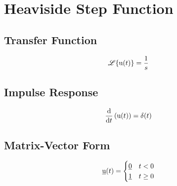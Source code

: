 \section*{Heaviside Step Function}
\subsection*{Transfer Function}
\[
    \laplace{\func{u}[t]} = \frac{1}{s}
\]

\subsection*{Impulse Response}
\[
    \deriv{t}{\func{u}[t]} = \func{\delta}[t]
\]

\subsection*{Matrix-Vector Form}
\[
    \func{\underline{u}}[t] =
    \begin{cases}
        \underline{0} & t < 0 \\
        \underline{1} & t \geq 0
    \end{cases}
\]